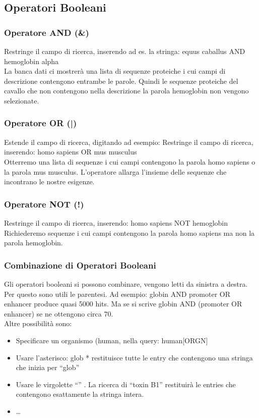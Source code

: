 \documentclass{article}
\begin{document}
\subsection{Operatori Booleani}
\subsubsection{Operatore AND (\&)}
Restringe il campo di ricerca, inserendo ad es. la stringa:
{\ttfamily equus caballus AND hemoglobin alpha}\\
La banca dati ci mostrerà una lista di sequenze proteiche i cui campi di
descrizione contengono entrambe le parole. Quindi le sequenze proteiche
del cavallo che non contengono nella descrizione la parola hemoglobin
non vengono selezionate.
\subsubsection{Operatore OR (|)}
Estende il campo di ricerca, digitando ad esempio:
Restringe il campo di ricerca, inserendo:
{\ttfamily homo sapiens OR mus musculus}\\
Otterremo una lista di sequenze i cui campi contengono la parola homo
sapiens o la parola mus musculus.
L'operatore allarga l'insieme
delle sequenze che incontrano le nostre esigenze.
\subsubsection{Operatore NOT (!)}
Restringe il campo di ricerca, inserendo:
{\ttfamily homo sapiens NOT hemoglobin}
Richiederemo sequenze i cui campi contengono la parola homo sapiens
ma non la parola hemoglobin.
\subsubsection{Combinazione di Operatori Booleani}
Gli operatori booleani si possono combinare, vengono letti da sinistra a
destra. Per questo sono utili le parentesi. Ad esempio: globin AND promoter OR enhancer produce quasi 5000
hits. Ma se si scrive globin AND (promoter OR enhancer) se ne
ottengono circa 70.\\
Altre possibilità sono:
\begin{itemize}
    \item Specificare un organismo (human, nella query:
    human[ORGN]
    \item Usare l'asterisco: glob * restituisce tutte le entry che
    contengono una stringa che inizia per “glob”
    \item Usare le virgolette “” . La ricerca di “toxin B1” restituirà le
    entries che contengono esattamente la stringa intera.
    \item \dots
\end{itemize}
\end{document}
